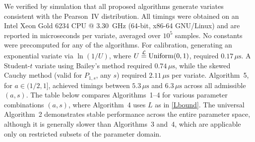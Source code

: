 \documentclass[12pt,reqno,tbtags]{amsart}
\newcommand{\inlaw}{\buildrel {\mathcal L} \over =}
\begin{document}
We verified by simulation that all proposed algorithms generate variates consistent with the Pearson~IV distribution. All timings were obtained on an Intel Xeon Gold 6234 CPU @ 3.30\, GHz (64-bit, x86-64 GNU/Linux) and are reported in microseconds per variate, averaged over $10^5$ samples. No constants were precomputed for any of the algorithms.
For calibration, generating an exponential variate via $\ln(1/U)$, where $U \inlaw \mathrm{Uniform}(0,1)$, required $0.17\,\mu\text{s}$. A Student-$t$ variate using Bailey's method required $0.74\,\mu\text{s}$, while the skewed Cauchy method (valid for $P_{1,s}$, any $s$) required $2.11\,\mu\text{s}$ per variate.
Algorithm~5, for $a \in (1/2,1]$, achieved timings between $5.3\,\mu\text{s}$ and $6.3\,\mu\text{s}$ across all admissible $(a,s)$.
The table below compares Algorithms~1--4 for various parameter combi\-nations $(a,s)$, where Algorithm~4 uses $L$ as in \eqref{Lbound}. The universal Algorithm~2 demonstrates stable performance across the entire parameter space, although it is generally slower than Algo\-rithms~3 and~4, which are applicable only on restricted subsets of the parameter domain.
\end{document}
